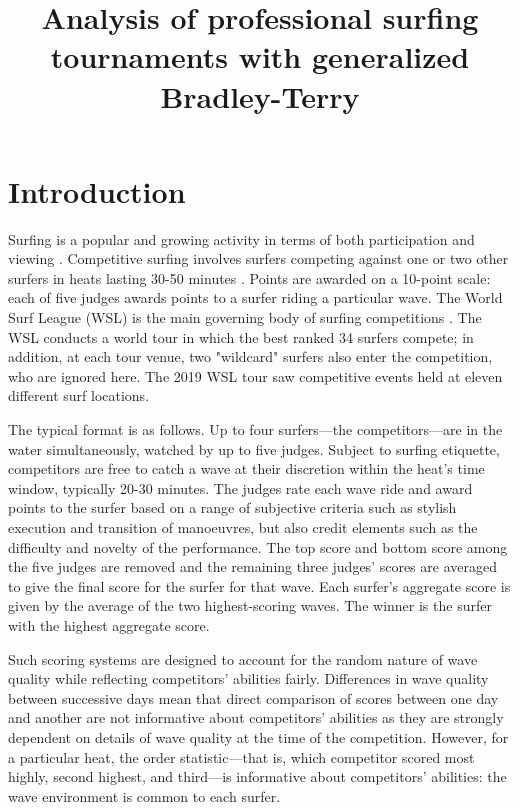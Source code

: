 \documentclass{article}
\begin{document}


\title{Analysis of professional surfing tournaments with generalized Bradley-Terry}


\section{Introduction}

Surfing is a popular and growing activity in terms of both
participation and viewing \cite{warshaw2010}.  Competitive surfing
involves surfers competing against one or two other surfers in heats
lasting 30-50 minutes \cite{booth1995}.  Points are awarded on a
10-point scale: each of five judges awards points to a surfer riding a
particular wave.  The World Surf League (WSL) is the main governing
body of surfing competitions \cite{wsl}.  The WSL conducts a world tour in
which the best ranked 34 surfers compete; in addition, at each tour
venue, two "wildcard" surfers also enter the competition, who are
ignored here.  The 2019 WSL tour saw competitive events held at eleven
different surf locations.

The typical format is as follows.  Up to four surfers---the
competitors---are in the water simultaneously, watched by up to five
judges.  Subject to surfing etiquette, competitors are free to catch a
wave at their discretion within the heat's time window, typically
20-30 minutes.  The judges rate each wave ride and award points to the
surfer based on a range of subjective criteria such as stylish
execution and transition of manoeuvres, but also credit elements such
as the difficulty and novelty of the performance.  The top score and
bottom score among the five judges are removed and the remaining three
judges' scores are averaged to give the final score for the surfer for
that wave.  Each surfer's aggregate score is given by the average of
the two highest-scoring waves.  The winner is the surfer with the
highest aggregate score.

Such scoring systems are designed to account for the random nature of
wave quality while reflecting competitors' abilities fairly.
Differences in wave quality between successive days mean that direct
comparison of scores between one day and another are not informative
about competitors' abilities as they are strongly dependent on details
of wave quality at the time of the competition.  However, for a
particular heat, the order statistic---that is, which competitor
scored most highly, second highest, and third---is informative about
competitors' abilities: the wave environment is common to each surfer.
\end{document}
